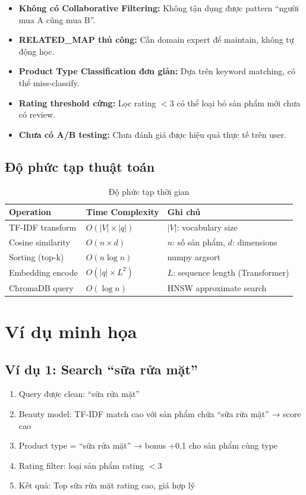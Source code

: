 \documentclass[12pt,a4paper]{report}
\begin{document}
\begin{itemize}
    \item \textbf{Không có Collaborative Filtering:} Không tận dụng được pattern ``người mua A cũng mua B''.
    \item \textbf{RELATED\_MAP thủ công:} Cần domain expert để maintain, không tự động học.
    \item \textbf{Product Type Classification đơn giản:} Dựa trên keyword matching, có thể miss-classify.
    \item \textbf{Rating threshold cứng:} Lọc rating $< 3$ có thể loại bỏ sản phẩm mới chưa có review.
    \item \textbf{Chưa có A/B testing:} Chưa đánh giá được hiệu quả thực tế trên user.
\end{itemize}

\subsection{Độ phức tạp thuật toán}

\begin{table}[H]
\centering
\caption{Độ phức tạp thời gian}
\label{tab:complexity}
\begin{tabular}{lll}
\toprule
\textbf{Operation} & \textbf{Time Complexity} & \textbf{Ghi chú} \\
\midrule
TF-IDF transform & $O(|V| \times |q|)$ & $|V|$: vocabulary size \\
Cosine similarity & $O(n \times d)$ & $n$: số sản phẩm, $d$: dimensions \\
Sorting (top-k) & $O(n \log n)$ & numpy argsort \\
Embedding encode & $O(|q| \times L^2)$ & $L$: sequence length (Transformer) \\
ChromaDB query & $O(\log n)$ & HNSW approximate search \\
\bottomrule
\end{tabular}
\end{table}

\section{Ví dụ minh họa}

\subsection{Ví dụ 1: Search ``sữa rửa mặt''}

\begin{enumerate}
    \item Query được clean: ``sữa rửa mặt''
    \item Beauty model: TF-IDF match cao với sản phẩm chứa ``sữa rửa mặt'' → score cao
    \item Product type = ``sữa rửa mặt'' → bonus +0.1 cho sản phẩm cùng type
    \item Rating filter: loại sản phẩm rating $< 3$
    \item Kết quả: Top sữa rửa mặt rating cao, giá hợp lý
\end{enumerate}
\end{document}
